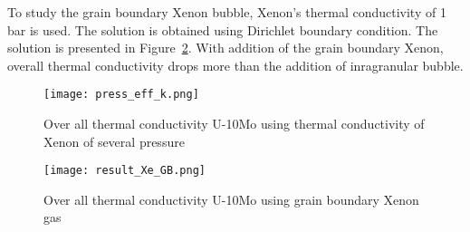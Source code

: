 \begin{doublespacing}
To study the grain boundary Xenon bubble, Xenon's thermal conductivity of 1 bar is used. The solution is obtained using Dirichlet boundary condition. The solution is presented in Figure~\ref{fig_eff_K_GB}. With addition of the grain boundary Xenon, overall thermal conductivity drops more than the addition of inragranular bubble.


\begin{figure}[H]
	\centering
	\texttt{[image: press\_eff\_k.png]}
	\caption{Over all thermal conductivity U-10Mo using thermal conductivity of Xenon of several pressure}
	\label{fig_press_K}
\end{figure}


\begin{figure}[H]
	\centering
	\texttt{[image: result\_Xe\_GB.png]}
	\caption{Over all thermal conductivity U-10Mo using grain boundary Xenon gas}
	\label{fig_eff_K_GB}
\end{figure}






\end{doublespacing}
